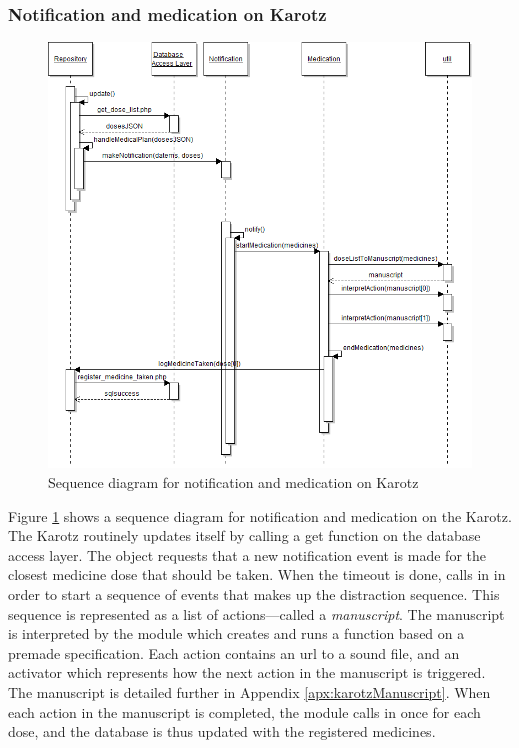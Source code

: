 \subsubsection{Notification and medication on Karotz}
\begin{figure}
	\centering
		\includegraphics[width=\linewidth]{Pictures/ArchPictures/KarotzMedicationSequence}
	\caption{Sequence diagram for notification and medication on Karotz}
	\label{fig:karotz-sequence}
\end{figure}
Figure \ref{fig:karotz-sequence} shows a sequence diagram for notification and medication on the Karotz. The Karotz routinely updates itself by
calling a get function on the database access layer. The  object requests that a new notification event is made for the closest
medicine dose that should be taken. When the timeout is done,  calls  in  in order
to start a sequence of events that makes up the distraction sequence. This sequence is represented as a list of actions---called a \emph{manuscript}.
The manuscript is interpreted by the  module which creates and runs a function based on a premade specification. Each action contains
an url to a sound file, and an activator which represents how the next action in the manuscript is triggered. The manuscript is detailed further in
Appendix \ref{apx:karotzManuscript}. When each action in the manuscript is completed, the  module calls 
in  once for each dose, and the database is thus updated with the registered medicines.


